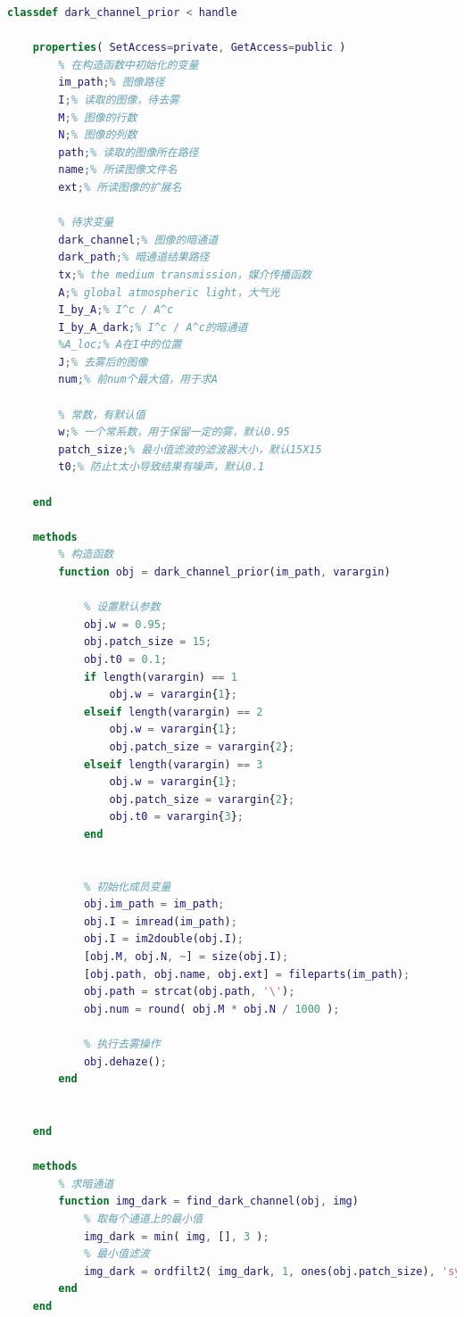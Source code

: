 \documentclass[UTF8]{ctexart}
\begin{document}
\begin{lstlisting}[language=Matlab,caption={暗通道先验算法代码复现\protect\footnotemark[1]}]
classdef dark_channel_prior < handle
   
    properties( SetAccess=private, GetAccess=public )
        % 在构造函数中初始化的变量
        im_path;% 图像路径
        I;% 读取的图像，待去雾
        M;% 图像的行数
        N;% 图像的列数
        path;% 读取的图像所在路径
        name;% 所读图像文件名
        ext;% 所读图像的扩展名
        
        % 待求变量
        dark_channel;% 图像的暗通道
        dark_path;% 暗通道结果路径
        tx;% the medium transmission，媒介传播函数 
        A;% global atmospheric light，大气光
        I_by_A;% I^c / A^c
        I_by_A_dark;% I^c / A^c的暗通道
        %A_loc;% A在I中的位置
        J;% 去雾后的图像
        num;% 前num个最大值，用于求A
        
        % 常数，有默认值
        w;% 一个常系数，用于保留一定的雾，默认0.95
        patch_size;% 最小值滤波的滤波器大小，默认15X15
        t0;% 防止t太小导致结果有噪声，默认0.1
        
    end
    
    methods
        % 构造函数
        function obj = dark_channel_prior(im_path, varargin)
            
            % 设置默认参数
            obj.w = 0.95;
            obj.patch_size = 15;
            obj.t0 = 0.1;
            if length(varargin) == 1
                obj.w = varargin{1};
            elseif length(varargin) == 2
                obj.w = varargin{1};
                obj.patch_size = varargin{2};
            elseif length(varargin) == 3
                obj.w = varargin{1};
                obj.patch_size = varargin{2};
                obj.t0 = varargin{3};
            end
                
            
            % 初始化成员变量
            obj.im_path = im_path;
            obj.I = imread(im_path);
            obj.I = im2double(obj.I);
            [obj.M, obj.N, ~] = size(obj.I);
            [obj.path, obj.name, obj.ext] = fileparts(im_path);
            obj.path = strcat(obj.path, '\');
            obj.num = round( obj.M * obj.N / 1000 );
            
            % 执行去雾操作
            obj.dehaze();
        end
        
        
    end
    
    methods 
        % 求暗通道
        function img_dark = find_dark_channel(obj, img)
            % 取每个通道上的最小值 
            img_dark = min( img, [], 3 );
            % 最小值滤波
            img_dark = ordfilt2( img_dark, 1, ones(obj.patch_size), 'symmetric');
        end
    end
        

\end{lstlisting}
\end{document}
